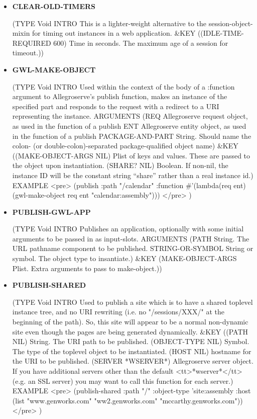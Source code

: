 \documentclass [11pt]{book}
\begin{document}
\begin{itemize}
\item {}
\label{prim:clear-old-timers}
\textbf{CLEAR-OLD-TIMERS}

(TYPE Void INTRO  This is a lighter-weight alternative to the session-object-mixin for timing out instances
in a web application.
 \&KEY ((IDLE-TIME-REQUIRED 600) Time in seconds. The maximum age of a session for timeout.))



\item {}
\label{prim:gwl-make-object}
\textbf{GWL-MAKE-OBJECT}

(TYPE Void INTRO  Used within the context of the body of a :function argument to Allegroserve's
publish function, makes an instance of the specified part and responds to the request
with a redirect to a URI representing the instance.
 ARGUMENTS (REQ Allegroserve request object, as used in the function of a publish ENT Allegroserve entity object, as used in the function of a publish PACKAGE-AND-PART String. Should name the colon- (or double-colon)-separated
package-qualified object name) \&KEY ((MAKE-OBJECT-ARGS NIL) Plist of keys and values. These are passed to the object upon instantiation. (SHARE? NIL) Boolean. If non-nil, the instance ID will be the constant string ``share'' rather than a real instance id.) EXAMPLE <pre> 
  (publish :path "/calendar"
           :function \#'(lambda(req ent) (gwl-make-object req ent "calendar:assembly")))
</pre>
)



\item {}
\label{prim:publish-gwl-app}
\textbf{PUBLISH-GWL-APP}

(TYPE Void INTRO  Publishes an application, optionally with some initial arguments to be passed in as input-slots.
 ARGUMENTS (PATH String. The URL pathname component to be published. STRING-OR-SYMBOL String or symbol. The object type to insantiate.) \&KEY (MAKE-OBJECT-ARGS Plist. Extra arguments to pass to make-object.))



\item {}
\label{prim:publish-shared}
\textbf{PUBLISH-SHARED}

(TYPE Void INTRO  Used to publish a site which is to have a shared toplevel instance tree,
and no URI rewriting (i.e. no "/sessions/XXX/" at the beginning of the path). So,
this site will appear to be a normal non-dynamic site even though the pages are
being generated dynamically.
 \&KEY ((PATH NIL) String. The URI path to be published. (OBJECT-TYPE NIL) Symbol. The type of the toplevel object to be instantiated. (HOST NIL) hostname for the URI to be published. (SERVER *WSERVER*) Allegroserve server object. If you have additional servers other than the default
<tt>*wserver*</tt> (e.g. an SSL server) you may want to call this function for each server.) EXAMPLE <pre> 
  (publish-shared :path "/"
                  :object-type 'site:assembly
                  :host (list "www.genworks.com" "ww2.genworks.com" "mccarthy.genworks.com"))
</pre>
)




\end{itemize}
\end{document}
